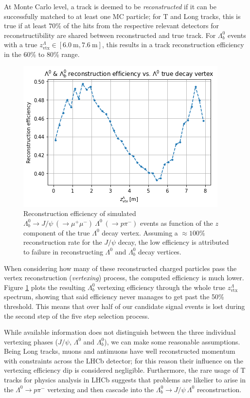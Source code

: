 At Monte Carlo level, a track is deemed to be \textit{reconstructed} if it can be successfully matched to at least one MC particle;
for T and Long tracks, this is true if at least $70\%$ of the hits from the respective relevant detectors for reconstructibility are shared between reconstructed and true track. For $\Lambda^0_b$ events with a true $z_\text{vtx}^\Lambda \in [\SI{6.0}{\meter}, \SI{7.6}{\meter}]$, this results in a track reconstruction efficiency in the 60\% to 80\% range.

\begin{figure}[t!]
	\centering
	\includegraphics[width=.6\textwidth]{graphics/03-vertex_reconstruction/lambda_lambdab_reco_efficiency.png}
	\caption[A]{Reconstruction efficiency of simulated $\Lambda^0_b \rightarrow J/\psi~(\rightarrow \mu^+\mu^-)~\Lambda^0~(\rightarrow p\pi^-)$ events as function of the $z$ component of the true $\Lambda^0$ decay vertex. Assuming a $\approx 100\%$ reconstruction rate for the $J/\psi$ decay, the low efficiency is attributed to failure in reconstructing $\Lambda^0$ and $\Lambda^0_b$ decay vertices.}
	\label{fig:lambda_lambdab_reco_efficiency}
\end{figure}

When considering how many of these reconstructed charged particles pass the vertex reconstruction (\textit{vertexing}) process, the computed efficiency is much lower.
Figure \ref{fig:lambda_lambdab_reco_efficiency} plots the resulting $\Lambda_b^0$ vertexing efficiency through the whole true $z_\text{vtx}^\Lambda$ spectrum, showing that said efficiency never manages to get past the 50\% threshold.
This means that over half of our candidate signal events is lost during the second step of the five step selection process.

While available information does not distinguish between the three individual vertexing phases ($J/\psi$, $\Lambda^0$ and $\Lambda_b^0$), we can make some reasonable assumptions.
Being Long tracks, muons and antimuons have well reconstructed momentum with constraints across the LHCb detector;
for this reason their influence on the vertexing efficiency dip is considered negligible.
Furthermore, the rare usage of T tracks for physics analysis in LHCb suggests that problems are likelier to arise in the $\Lambda^0 \rightarrow p\pi^-$ vertexing and then cascade into the $\Lambda_b^0 \rightarrow J/\psi~\Lambda^0$ reconstruction.

